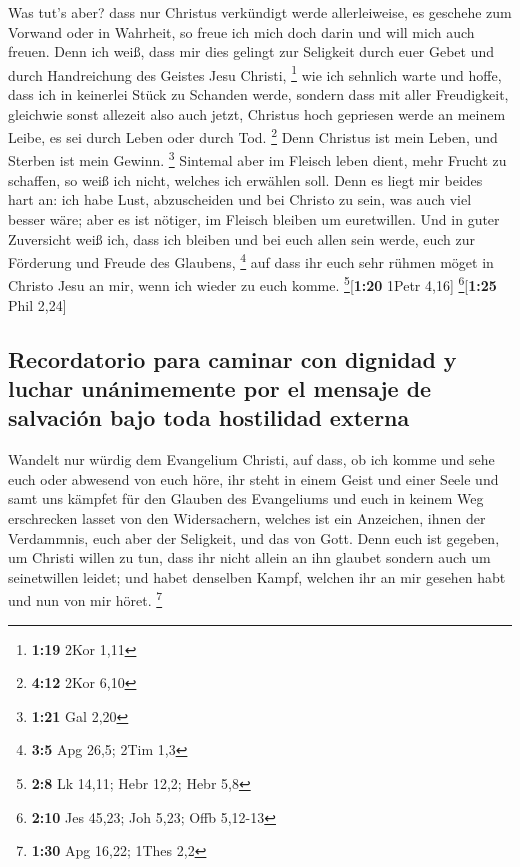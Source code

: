  Was tut's aber? dass nur Christus verkündigt werde
allerleiweise, es geschehe zum Vorwand oder in Wahrheit, so freue ich
mich doch darin und will mich auch freuen.  Denn ich
weiß, dass mir dies gelingt zur Seligkeit durch euer Gebet und durch
Handreichung des Geistes Jesu Christi, \footnote{\textbf{1:19} 2Kor 1,11}
 wie ich sehnlich warte und hoffe, dass ich in keinerlei
Stück zu Schanden werde, sondern dass mit aller Freudigkeit, gleichwie
sonst allezeit also auch jetzt, Christus hoch gepriesen werde an meinem
Leibe, es sei durch Leben oder durch Tod. \footnote{\textbf{4:12} 2Kor
  6,10}  Denn Christus ist mein Leben, und Sterben ist
mein Gewinn. \footnote{\textbf{1:21} Gal 2,20}  Sintemal
aber im Fleisch leben dient, mehr Frucht zu schaffen, so weiß ich nicht,
welches ich erwählen soll.  Denn es liegt mir beides hart
an: ich habe Lust, abzuscheiden und bei Christo zu sein, was auch viel
besser wäre;  aber es ist nötiger, im Fleisch bleiben um
euretwillen.  Und in guter Zuversicht weiß ich, dass ich
bleiben und bei euch allen sein werde, euch zur Förderung und Freude des
Glaubens, \footnote{\textbf{3:5} Apg 26,5; 2Tim 1,3}  auf
dass ihr euch sehr rühmen möget in Christo Jesu an mir, wenn ich wieder
zu euch komme. \footnote{\textbf{2:8} Lk 14,11; Hebr 12,2; Hebr 5,8}{[}\textbf{1:20}
1Petr 4,16{]} \footnote{\textbf{2:10} Jes 45,23; Joh 5,23; Offb 5,12-13}{[}\textbf{1:25}
Phil 2,24{]}

\hypertarget{recordatorio-para-caminar-con-dignidad-y-luchar-unuxe1nimemente-por-el-mensaje-de-salvaciuxf3n-bajo-toda-hostilidad-externa}{%
\subsection{Recordatorio para caminar con dignidad y luchar unánimemente
por el mensaje de salvación bajo toda hostilidad
externa}\label{recordatorio-para-caminar-con-dignidad-y-luchar-unuxe1nimemente-por-el-mensaje-de-salvaciuxf3n-bajo-toda-hostilidad-externa}}

 Wandelt nur würdig dem Evangelium Christi, auf dass, ob
ich komme und sehe euch oder abwesend von euch höre, ihr steht in einem
Geist und einer Seele und samt uns kämpfet für den Glauben des
Evangeliums  und euch in keinem Weg erschrecken lasset
von den Widersachern, welches ist ein Anzeichen, ihnen der Verdammnis,
euch aber der Seligkeit, und das von Gott.  Denn euch ist
gegeben, um Christi willen zu tun, dass ihr nicht allein an ihn glaubet
sondern auch um seinetwillen leidet;  und habet denselben
Kampf, welchen ihr an mir gesehen habt und nun von mir höret.
\footnote{\textbf{1:30} Apg 16,22; 1Thes 2,2}

